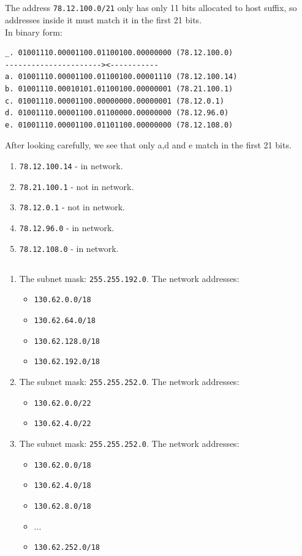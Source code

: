 \subsection{}
The address \texttt{78.12.100.0/21} only has only 11 bits
allocated to host suffix, so addresses inside it must match it in the first 21 bits.\\
In binary form:
\begin{verbatim}
_. 01001110.00001100.01100100.00000000 (78.12.100.0)
----------------------><-----------
a. 01001110.00001100.01100100.00001110 (78.12.100.14)
b. 01001110.00010101.01100100.00000001 (78.21.100.1)
c. 01001110.00001100.00000000.00000001 (78.12.0.1)
d. 01001110.00001100.01100000.00000000 (78.12.96.0)
e. 01001110.00001100.01101100.00000000 (78.12.108.0)
\end{verbatim}
After looking carefully, we see that only a,d and e match in the first 21 bits.
\begin{enumerate}[label=\alph*.]
	\item \texttt{78.12.100.14} -  in network.
	\item \texttt{78.21.100.1} - not in network.
	\item \texttt{78.12.0.1} - not in network.
	\item \texttt{78.12.96.0} - in network.
	\item \texttt{78.12.108.0} - in network.
\end{enumerate}

\subsection{}
\begin{enumerate}[label=\alph*.]
	\item The subnet mask: \texttt{255.255.192.0}. The network addresses:
	\begin{itemize}
		\item \texttt{130.62.0.0/18}
		\item \texttt{130.62.64.0/18}
		\item \texttt{130.62.128.0/18}
		\item \texttt{130.62.192.0/18}
	\end{itemize}
	\item The subnet mask: \texttt{255.255.252.0}. The network addresses:
	\begin{itemize}
		\item \texttt{130.62.0.0/22}
		\item \texttt{130.62.4.0/22}
	\end{itemize}
	\item The subnet mask: \texttt{255.255.252.0}. The network addresses:
	\begin{itemize}
		\item \texttt{130.62.0.0/18}
		\item \texttt{130.62.4.0/18}
		\item \texttt{130.62.8.0/18}
		\item ...
		\item \texttt{130.62.252.0/18}
	\end{itemize}
\end{enumerate}

